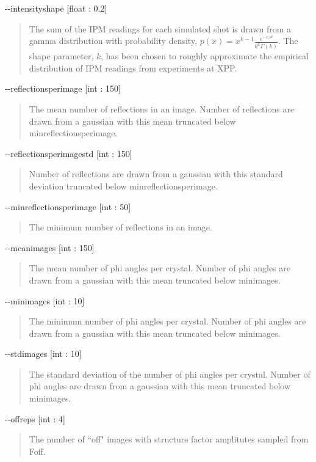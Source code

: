 \documentclass{report}
\begin{document}
\noindent
-{}-intensityshape [float : 0.2]
\begin{quote}
    The sum of the IPM readings for each simulated shot is drawn from a gamma distribution with probability density, 
    $p(x) = x^{k - 1} \frac {e^{-x/\theta}} {\theta^k \Gamma(k)}$. 
    The shape parameter, $k$, has been chosen to roughly approximate the empirical distribution of IPM readings from experiments at XPP. 
\end{quote}


\noindent
-{}-reflectionsperimage [int : 150]
\begin{quote}
    The mean number of reflections in an image. 
    Number of reflections are drawn from a gaussian with this mean truncated below minreflectionsperimage.
\end{quote}

\noindent
-{}-reflectionsperimagestd [int : 150]
\begin{quote}
    Number of reflections are drawn from a gaussian with this standard deviation truncated below minreflectionsperimage.
\end{quote}

\noindent
-{}-minreflectionsperimage [int : 50]
\begin{quote}
    The minimum number of reflections in an image. 
\end{quote}

\noindent
-{}-meanimages [int : 150]
\begin{quote}
    The mean number of phi angles per crystal. 
    Number of phi angles are drawn from a gaussian with this mean truncated below minimages.
\end{quote}

\noindent
-{}-minimages [int : 10]
\begin{quote}
    The minimum number of phi angles per crystal. 
    Number of phi angles are drawn from a gaussian with this mean truncated below minimages.
\end{quote}

\noindent
-{}-stdimages [int : 10]
\begin{quote}
    The standard deviation of the number of phi angles per crystal. 
    Number of phi angles are drawn from a gaussian with this mean truncated below minimages.
\end{quote}


\noindent
-{}-offreps [int : 4]
\begin{quote}
    The number of ``off" images with structure factor amplitutes sampled from Foff.
\end{quote}
\end{document}
